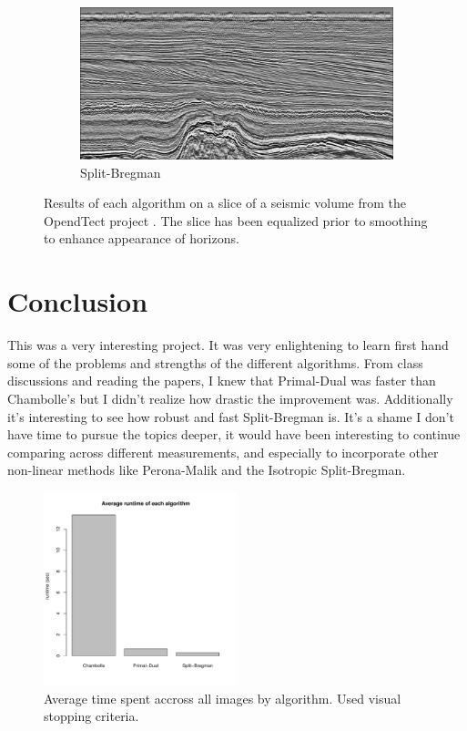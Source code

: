 \documentclass[11pt]{article}
\begin{document}
\begin{figure}
\begin{subfigure}[b]{0.5\textwidth}
\label{slice:pd}
\end{subfigure}
\begin{subfigure}[b]{0.5\textwidth}
\centering
\includegraphics[width=\textwidth]{slice_eq_sb}
\caption{Split-Bregman}
\label{slice:sb}
\end{subfigure}
\caption{Results of each algorithm on a slice of a seismic volume from the OpendTect project \cite{opendTectWeb}. The slice has been equalized prior to smoothing to enhance appearance of horizons.}
\label{fig:slice:dn}
\end{figure}


\section{Conclusion}

This was a very interesting project.
It was very enlightening to learn first hand some of the problems and strengths of the different algorithms.
From class discussions and reading the papers, I knew that Primal-Dual was faster than Chambolle's but I didn't realize how drastic the improvement was.
Additionally it's interesting to see how robust and fast Split-Bregman is.
It's a shame I don't have time to pursue the topics deeper, it would have been interesting to continue comparing across different measurements, and especially to incorporate other non-linear methods like Perona-Malik and the Isotropic Split-Bregman.

\begin{figure}
\centering
\graphicspath{{../images/}}
\includegraphics[width=0.5\textwidth]{average_timing}
\caption{Average time spent accross all images by algorithm.  Used visual stopping criteria.}
\label{fig:timing}
\end{figure}




\end{document}
